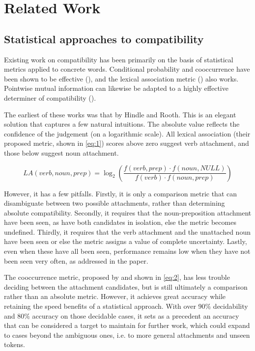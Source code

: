 \documentclass[a4paper, 12pt]{article}
\begin{document}
\section{Related Work}

\subsection{Statistical approaches to compatibility}

Existing work on compatibility has been primarily on the basis of statistical metrics applied to concrete words. Conditional probability and cooccurrence have been shown to be effective (\cite{Volk}), and the lexical association metric (\cite{HindleRooth}) also works. Pointwise mutual information can likewise be adapted to a highly effective determiner of compatibility (\cite{vanNoord}).

The earliest of these works was that by Hindle and Rooth. This is an elegant solution that captures a few natural intuitions. The absolute value reflects the confidence of the judgement (on a logarithmic scale). All lexical association (their proposed metric, shown in \ref{eq:1}) scores above zero suggest verb attachment, and those below suggest noun attachment.

\begin{equation} \label{eq:1}
	LA(verb, noun, prep) = \log_{2} \left( \frac{f(verb, prep) \cdot f(noun, NULL)}{f(verb) \cdot f(noun, prep)} \right)
\end{equation}

However, it has a few pitfalls. Firstly, it is only a comparison metric that can disambiguate between two possible attachments, rather than determining absolute compatibility. Secondly, it requires that the noun-preposition attachment have been seen, as have both candidates in isolation, else the metric becomes undefined. Thirdly, it requires that the verb attachment and the unattached noun have been seen or else the metric assigns a value of complete uncertainty. Lastly, even when these have all been seen, performance remains low when they have not been seen very often, as addressed in the paper.

The cooccurrence metric, proposed by \cite{Volk} and shown in \ref{eq:2}, has less trouble deciding between the attachment candidates, but is still ultimately a comparison rather than an absolute metric. However, it achieves great accuracy while retaining the speed benefits of a statistical approach. With over 90\% decidability and 80\% accuracy on those decidable cases, it sets as a precedent an accuracy that can be considered a target to maintain for further work, which could expand to cases beyond the ambiguous ones, i.e. to more general attachments and unseen tokens.
\end{document}
